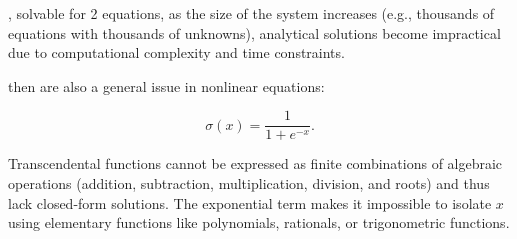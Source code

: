 
, solvable for 2 equations, as the size of the system increases (e.g., thousands of equations with thousands of unknowns),
analytical solutions become impractical due to computational complexity and time constraints.

 then are also a general issue in nonlinear equations:

\begin{equation}
            \sigma(x) = \frac{1}{1 + e^{-x}}. 
\end{equation}
\vspace{1em}



Transcendental functions cannot be expressed as finite combinations of algebraic operations (addition, subtraction, multiplication, division, and roots) and thus lack closed-form solutions.
The exponential term makes it impossible to isolate $x$ using elementary functions like polynomials, rationals, or trigonometric functions.



